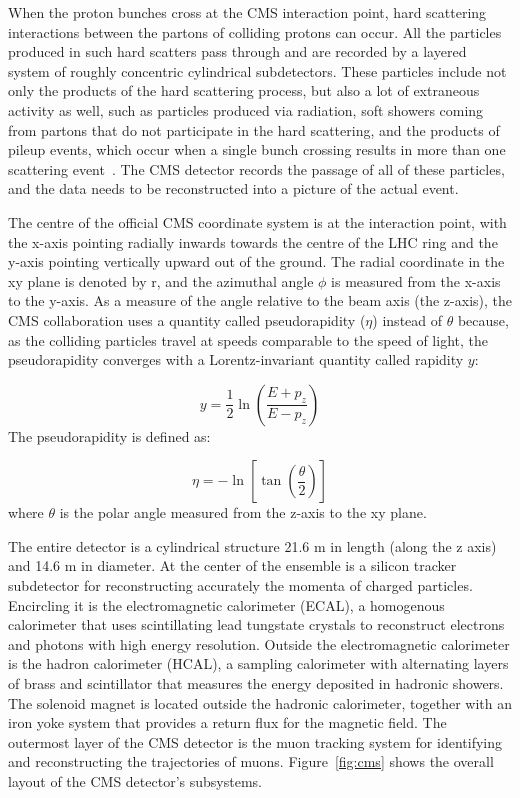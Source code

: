 When the proton bunches cross at the CMS interaction point, hard scattering interactions between the partons of colliding protons can occur. All the particles produced in such hard scatters pass through and are recorded by a layered system of roughly concentric cylindrical subdetectors. These particles include not only the products of the hard scattering process, but also a lot of extraneous activity as well, such as particles produced via radiation, soft showers coming from partons that do not participate in the hard scattering, and the products of pileup events, which occur when a single bunch crossing results in more than one scattering event~\cite{Sjostrand:2006za}. The CMS detector records the passage of all of these particles, and the data needs to be reconstructed into a picture of the actual event.

The centre of the official CMS coordinate system is at the interaction point, with the x-axis pointing radially inwards towards the centre of the LHC ring and the y-axis pointing vertically upward out of the ground. The radial coordinate in the xy plane is denoted by r, and the azimuthal angle $\phi$ is measured from the x-axis to the y-axis. As a measure of the angle relative to the beam axis (the z-axis), the CMS collaboration uses a quantity called pseudorapidity ($\eta$) instead of $\theta$ because, as the colliding particles travel at speeds comparable to the speed of light, the pseudorapidity converges with a Lorentz-invariant quantity called rapidity $y$:

\begin{equation}
y = \frac{1}{2}\ln(\frac{E+p_{z}}{E-p_{z}})
\label{eq:rapidity}
\end{equation}
The pseudorapidity is defined as:

\begin{equation}
\eta = -\ln[\tan(\frac{\theta}{2})]
\label{eq:pseudorapidity}
\end{equation}
where $\theta$ is the polar angle measured from the z-axis to the xy plane.

The entire detector is a cylindrical structure 21.6 m in length (along the z axis) and 14.6 m in diameter. At the center of the ensemble is a silicon tracker subdetector for reconstructing accurately the momenta of charged particles. Encircling it is the electromagnetic calorimeter (ECAL), a homogenous calorimeter that uses scintillating lead tungstate crystals to reconstruct electrons and photons with high energy resolution. Outside the electromagnetic calorimeter is the hadron calorimeter (HCAL), a sampling calorimeter with alternating layers of brass and scintillator that measures the energy deposited in hadronic showers. The solenoid magnet is located outside the hadronic calorimeter, together with an iron yoke system that provides a return flux for the magnetic field. The outermost layer of the CMS detector is the muon tracking system for identifying and reconstructing the trajectories of muons. Figure~\ref{fig:cms} shows the overall layout of the CMS detector's subsystems.

